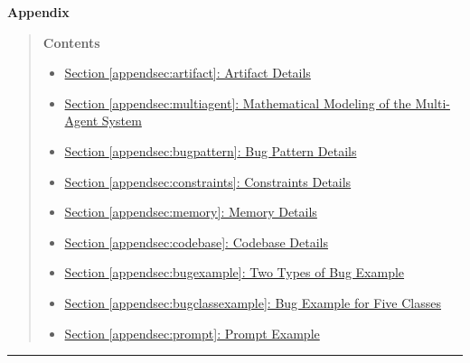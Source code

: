 \documentclass{article}
\theoremstyle{plain}
\theoremstyle{definition}
\theoremstyle{remark}
\begin{document}
\begin{center}
    {\LARGE \bf Appendix}
\end{center}
\begin{quote}
    \hypersetup{linkcolor=black} %
    \textbf{Contents}
    \begin{itemize}
    \item \hyperref[appendsec:artifact]{Section \ref{appendsec:artifact}: Artifact Details}
        \item \hyperref[appendsec:multiagent]{Section \ref{appendsec:multiagent}: Mathematical Modeling of the Multi-Agent System}
        \item \hyperref[appendsec:bugpattern]{Section \ref{appendsec:bugpattern}: Bug Pattern Details}
        \item \hyperref[appendsec:constraints]{Section \ref{appendsec:constraints}: Constraints Details}
        \item \hyperref[appendsec:memory]{Section \ref{appendsec:memory}: Memory Details}
        \item \hyperref[appendsec:codebase]{Section \ref{appendsec:codebase}: Codebase Details}
        \item \hyperref[appendsec:bugexample]{Section \ref{appendsec:bugexample}: Two Types of Bug Example}
        \item \hyperref[appendsec:bugclassexample]{Section \ref{appendsec:bugclassexample}: Bug Example for Five Classes}
        \item \hyperref[appendsec:prompt]{Section \ref{appendsec:prompt}: Prompt Example}
    \end{itemize}
\end{quote}
\hrule
\end{document}
